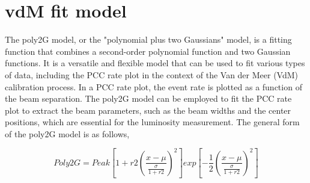 \section{vdM fit model}

The poly2G model, or the "polynomial plus two Gaussians" model, is a fitting function that combines a second-order polynomial function and two Gaussian functions. It is a versatile and flexible model that can be used to fit various types of data, including the PCC rate plot in the context of the Van der Meer (VdM) calibration process. In a PCC rate plot, the event rate is plotted as a function of the beam separation. The poly2G model can be employed to fit the PCC rate plot to extract the beam parameters, such as the beam widths and the center positions, which are essential for the luminosity measurement. The general form of the poly2G model is as follows,



\begin{equation}
Poly2G = Peak  \left [1+r2 \left(\frac{x-\mu} {\frac{\sigma}{1+r2}}\right)^2 \right] exp \left[-\frac{1}{2}\left(\frac{x-\mu}{\frac{\sigma}{1+r2}}\right)^2\right]
\end{equation}

